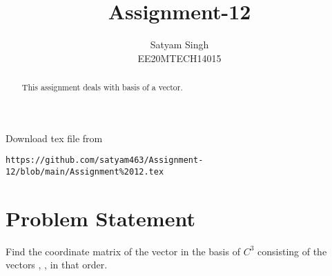 \documentclass[journal,12pt,twocolumn]{IEEEtran}
\begin{document}
\renewcommand{\thefigure}{\theproblem}
\def\putbox#1#2#3{\makebox[0in][l]{\makebox[#1][l]{}\raisebox{\baselineskip}[0in][0in]{\raisebox{#2}[0in][0in]{#3}}}}
     \def\rightbox#1{\makebox[0in][r]{#1}}
     \def\centbox#1{\makebox[0in]{#1}}
     \def\topbox#1{\raisebox{-\baselineskip}[0in][0in]{#1}}
     \def\midbox#1{\raisebox{-0.5\baselineskip}[0in][0in]{#1}}
\vspace{3cm}
\title{Assignment-12}
\author{Satyam Singh \\ EE20MTECH14015}
\maketitle
\newpage
\bigskip
\renewcommand{\thefigure}{\theenumi}
\renewcommand{\thetable}{\theenumi}
\begin{abstract}
This assignment deals with basis of a vector.
\end{abstract}
Download  tex file from 
\begin{lstlisting}
https://github.com/satyam463/Assignment-12/blob/main/Assignment%2012.tex
\end{lstlisting}
\section{Problem Statement}
Find the coordinate matrix of the vector  in the basis of $C^{3}$ consisting of the vectors  ,  ,  in that order.
\end{document}
